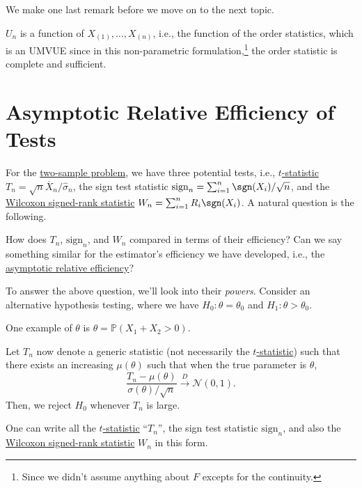 We make one last remark before we move on to the next topic.

\begin{remark}
	\(U_n\) is a function of \(X_{(1)}, \dots , X_{(n)}\), i.e., the function of the order statistics, which is an UMVUE since in this non-parametric formulation,\footnote{Since we didn't assume anything about \(F\) excepts for the continuity.} the order statistic is complete and sufficient.
\end{remark}

\section{Asymptotic Relative Efficiency of Tests}
For the \hyperref[prb:two-sample]{two-sample problem}, we have three potential tests, i.e., \hyperref[def:t-statistic]{ \(t\)-statistic} \(T_n = \sqrt{n} \overline{X} _n / \hat{\sigma} _n\), the sign test statistic \(\mathrm{sign} _n = \sum_{i=1}^{n} \sgn (X_i) / \sqrt{n}\), and the \hyperref[def:Wilcoxon-signed-rank-statistic]{Wilcoxon signed-rank statistic} \(W_n = \sum_{i=1}^{n} R_i \sgn (X_i)\). A natural question is the following.

\begin{problem*}
	How does \(T_n\), \(\mathrm{sign} _n\), and \(W_n\) compared in terms of their efficiency? Can we say something similar for the estimator's efficiency we have developed, i.e., the \hyperref[def:asymptotic-relative-efficiency-estimator]{asymptotic relative efficiency}?
\end{problem*}

To answer the above question, we'll look into their \emph{powers}. Consider an alternative hypothesis testing, where we have \(H_0 \colon \theta = \theta _0\) and \(H_1 \colon \theta > \theta _0\).

\begin{eg}
	One example of \(\theta \) is \(\theta = \mathbb{P} (X_1 + X_2 > 0)\).
\end{eg}

Let \(T_n\) now denote a generic statistic (not necessarily the \hyperref[def:t-statistic]{\(t\)-statistic}) such that there exists an increasing \(\mu (\theta )\) such that when the true parameter is \(\theta \),
\[
	\frac{T_n - \mu (\theta )}{\sigma (\theta ) / \sqrt{n} }
	\overset{D}{\to} \mathcal{N} (0, 1).
\]
Then, we reject \(H_0\) whenever \(T_n\) is large.

\begin{eg}
	One can write all the \hyperref[def:t-statistic]{\(t\)-statistic} ``\(T_n\)'', the sign test statistic \(\mathrm{sign} _n\), and also the \hyperref[def:Wilcoxon-signed-rank-statistic]{Wilcoxon signed-rank statistic} \(W_n\) in this form.
\end{eg}


